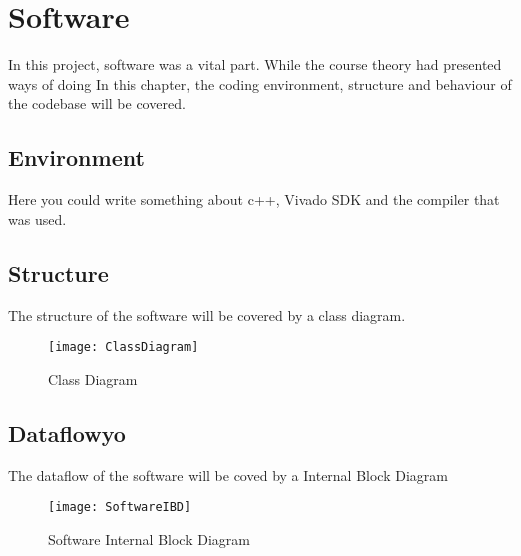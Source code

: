 \documentclass[Main]{subfiles}
\begin{document}
\section{Software} %
\label{sec:software}

	In this project, software was a vital part. 
	While the course theory had presented ways of doing 
	In this chapter, the coding environment, structure and behaviour of the codebase will be covered.
	
	\subsection{Environment} %
	\label{sub:software_environment}

		Here you could write something about c++, Vivado SDK and the compiler that was used.
	
	\subsection{Structure} %
	\label{sub:software_structure}
	
		The structure of the software will be covered by a class diagram.
		\begin{figure}[H]
			\centering
			\texttt{[image: ClassDiagram]}
			\caption{Class Diagram}
			\label{fig:classdiagram}
		\end{figure}

	\subsection{Dataflowyo} %
	\label{sub:software_dataflow}
		
		The dataflow of the software will be coved by a Internal Block Diagram
		
		\begin{figure}[H]
			\centering
			\texttt{[image: SoftwareIBD]}
			\caption{Software Internal Block Diagram}
			\label{fig:softwareibd}
		\end{figure}

\end{document}
